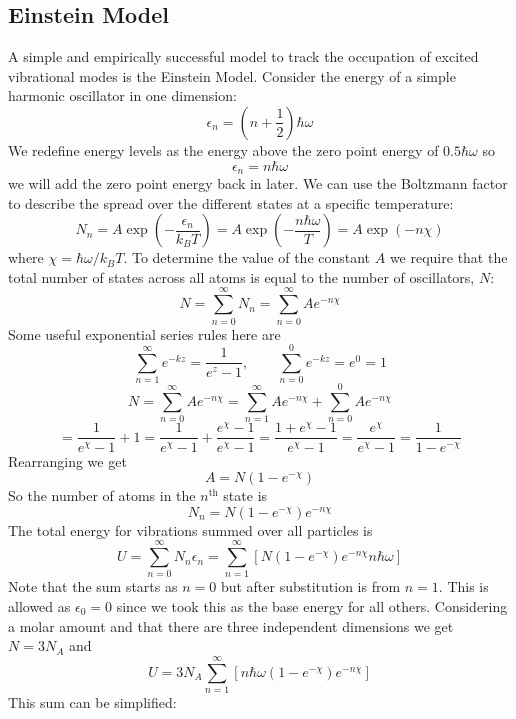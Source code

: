     \subsection{Einstein Model}
    A simple and empirically successful model to track the occupation of excited vibrational modes is the Einstein Model.
    Consider the energy of a simple harmonic oscillator in one dimension:
    \[\epsilon_n = \left(n + \frac{1}{2}\right)\hbar\omega\]
    We redefine energy levels as the energy above the zero point energy of \(0.5\hbar\omega\) so
    \[\epsilon_n = n\hbar\omega\]
    we will add the zero point energy back in later.
    We can use the Boltzmann factor to describe the spread over the different states at a specific temperature:
    \[N_n = A\exp\left(-\frac{\epsilon_n}{k_BT}\right) = A\exp\left(-\frac{n\hbar\omega}{T}\right) = A\exp(-n\chi)\]
    where \(\chi = \hbar\omega/k_BT\).
    To determine the value of the constant \(A\) we require that the total number of states across all atoms is equal to the number of oscillators, \(N\):
    \[N = \sum_{n = 0}^\infty N_n = \sum_{n = 0}^\infty Ae^{-n\chi}\]
    Some useful exponential series rules here are
    \[\sum_{n = 1}^\infty e^{-kz} = \frac{1}{e^z - 1},\qquad \sum_{n = 0}^0 e^{-kz} = e^0 = 1\]
    \[N = \sum_{n = 0}^\infty Ae^{-n\chi} = \sum_{n = 1}^\infty Ae^{-n\chi} + \sum_{n = 0}^0 Ae^{-n\chi}\]
    \[= \frac{1}{e^{\chi} - 1} + 1 = \frac{1}{e^{\chi} - 1} + \frac{e^{\chi} - 1}{e^{\chi} - 1} = \frac{1 + e^{\chi} - 1}{e^{\chi} - 1} = \frac{e^{\chi}}{e^{\chi} - 1} = \frac{1}{1 - e^{-\chi}}\]
    Rearranging we get
    \[A = N(1 - e^{-\chi})\]
    So the number of atoms in the \(n^\text{th}\) state is
    \[N_n = N(1 - e^{-\chi})e^{-n\chi}\]
    The total energy for vibrations summed over all particles is
    \[U = \sum_{n = 0}^\infty N_n\epsilon_n = \sum_{n = 1}^\infty\left[N(1 - e^{-\chi})e^{-n\chi}n\hbar\omega\right]\]
    Note that the sum starts as \(n = 0\) but after substitution is from \(n = 1\).
    This is allowed as \(\epsilon_0 = 0\) since we took this as the base energy for all others.
    Considering a molar amount and that there are three independent dimensions we get \(N = 3N_A\) and
    \[U = 3N_A\sum_{n = 1}^\infty \left[n\hbar\omega(1 - e^{-\chi})e^{-n\chi}\right]\]
    This sum can be simplified:
